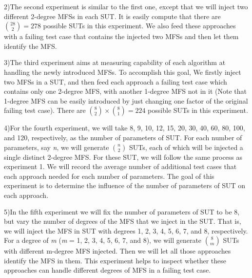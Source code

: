 \documentclass{sig-alternate-05-2015}
\begin{document}
{{%

2)The second experiment is similar to the first one, except that we will inject two different 2-degree MFSs in each SUT. It is easily compute that there are $\binom{28}{2} = 278$  possible SUTs in this experiment. We also feed these approaches with a failing test case that contains the injected two MFSs and then let them identify the MFS.

3)The third experiment aims at measuring capability of each algorithm at handling the  newly introduced MFSs. To accomplish this goal, We firstly inject two MFSs in a SUT, and then feed each approach a failing test case which contains only one 2-degree MFS, with another 1-degree MFS not in it (Note that 1-degree MFS can be easily introduced by just changing one factor of the original failing test case). There are $\binom{8}{2} \times \binom{8}{1} = 224$ possible SUTs in this experiment.


4)For the fourth experiment, we will take 8, 9, 10, 12, 15, 20, 30, 40, 60, 80, 100, and 120, respectively,  as the number of parameters of SUT. For each number of parameters, say \emph{n}, we will generate $\binom{n}{2}$ SUTs, each of which will be injected a single distinct 2-degree MFS. For these SUT, we will follow the same process as experiment 1. We will record the average number of additional test cases that each approach needed for each number of parameters. The goal of this experiment is to determine the influence of the number of parameters of SUT on each approach.

5)In the fifth experiment we will fix the number of parameters of SUT to be 8, but vary the number of degrees of the MFS that we inject in the SUT. That is, we will inject the MFS in SUT with degrees 1, 2, 3, 4, 5, 6, 7, and 8, respectively. For a degree of \emph{m} (\emph{m} = 1, 2, 3, 4, 5, 6, 7, and 8), we will generate $\binom{8}{m}$ SUTs with different m-degree MFS injected. Then we will let all those approaches identify the MFS in them. This experiment helps to inspect whether these approaches can handle different degrees of MFS in a failing test case.

}}
\end{document}
